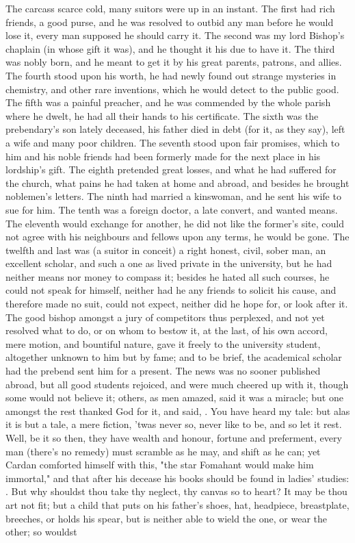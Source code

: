 {The carcass scarce cold, many suitors were up in an instant. The first had rich friends, a good purse, and he was resolved to outbid any man before he would lose it, every man supposed he should carry it. The second was my lord Bishop's chaplain (in whose gift it was), and he thought it his due to have it. The third was nobly born, and he meant to get it by his great parents, patrons, and allies. The fourth stood upon his worth, he had newly found out strange mysteries in chemistry, and other rare inventions, which he would detect to the public good. The fifth was a painful preacher, and he was commended by the whole parish where he dwelt, he had all their hands to his certificate. The sixth was the prebendary's son lately deceased, his father died in debt (for it, as they say), left a wife and many poor children. The seventh stood upon fair promises, which to him and his noble friends had been formerly made for the next place in his lordship's gift. The eighth pretended great losses, and what he had suffered for the church, what pains he had taken at home and abroad, and besides he brought noblemen's letters. The ninth had married a kinswoman, and he sent his wife to sue for him. The tenth was a foreign doctor, a late convert, and wanted means. The eleventh would exchange for another, he did not like the former's site, could not agree with his neighbours and fellows upon any terms, he would be gone. The twelfth and last was (a suitor in conceit) a right honest, civil, sober man, an excellent scholar, and such a one as lived private in the university, but he had neither means nor money to compass it; besides he hated all such courses, he could not speak for himself, neither had he any friends to solicit his cause, and therefore made no suit, could not expect, neither did he hope for, or look after it. The good bishop amongst a jury of competitors thus perplexed, and not yet resolved what to do, or on whom to bestow it, at the last, of his own accord, mere motion, and bountiful nature, gave it freely to the university student, altogether unknown to him but by fame; and to be brief, the academical scholar had the prebend sent him for a present. The news was no sooner published abroad, but all good students rejoiced, and were much cheered up with it, though some would not believe it; others, as men amazed, said it was a miracle; but one amongst the rest thanked God for it, and said, . You have heard my tale: but alas it is but a tale, a mere fiction, 'twas never so, never like to be, and so let it rest. Well, be it so then, they have wealth and honour, fortune and preferment, every man (there's no remedy) must scramble as he may, and shift as he can; yet Cardan comforted himself with this, "the star Fomahant would make him immortal," and that after his decease his books should be found in ladies' studies: . But why shouldst thou take thy neglect, thy canvas so to heart? It may be thou art not fit; but a child that puts on his father's shoes, hat, headpiece, breastplate, breeches, or holds his spear, but is neither able to wield the one, or wear the other; so wouldst }
